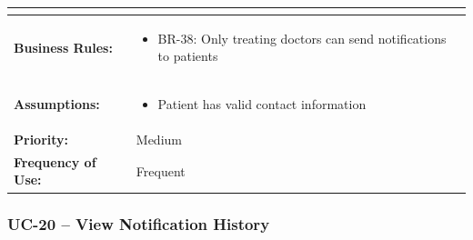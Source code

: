 \documentclass[12pt,a4paper]{article}
\begin{document}
\begin{longtable}{|p{4.5cm}|p{10.5cm}|}
\begin{itemize}
\end{itemize} \\
\hline
\textbf{Business Rules:} &
\begin{itemize}
  \item BR-38: Only treating doctors can send notifications to patients
\end{itemize} \\
\hline
\textbf{Assumptions:} &
\begin{itemize}
  \item Patient has valid contact information
\end{itemize} \\
\hline
\textbf{Priority:} & Medium \\
\hline
\textbf{Frequency of Use:} & Frequent \\
\hline
\end{longtable}

\subsubsection{UC-20 – View Notification History}
\end{document}
